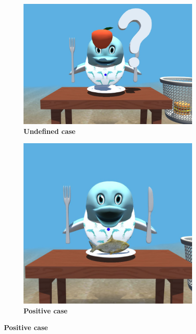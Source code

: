 \documentclass [12pt]{article}
\begin{document}
\begin{itemize}[•]
\begin{figure}[h!]
\begin{subfigure}[tl]{0.3\linewidth}
\end{subfigure}\hfill
\begin{subfigure}[tr]{0.3\linewidth}
\includegraphics[width=\linewidth]{UndefinedCaseFood.jpg}
\caption{\textbf{Undefined case}}
\end{subfigure}
\hspace*{\fill}
\begin{subfigure}[tr]{0.3\linewidth}
\includegraphics[width=\linewidth]{PositiveCaseFood.jpg}
\caption{\textbf{Positive case}}
\end{subfigure}

\end{figure}
\end{itemize}
\end{document}
